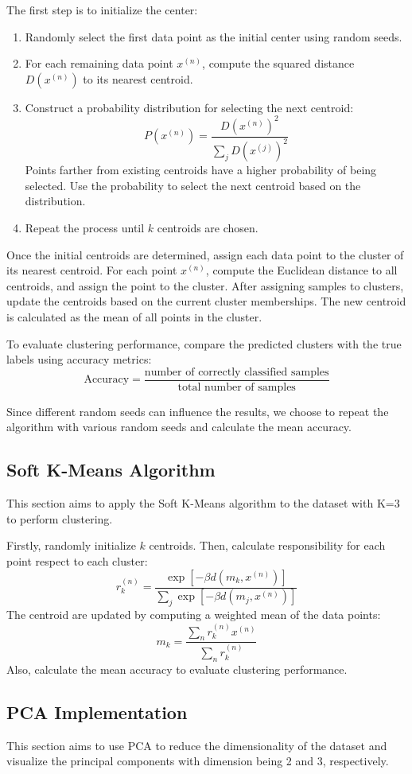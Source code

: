 \documentclass{article}
\begin{document}
The first step is to initialize the center:
\begin{enumerate}
    \item Randomly select the first data point as the initial center using random seeds.
    \item For each remaining data point $x^{(n)}$, compute the squared distance $D(x^{(n)})$ to its nearest centroid.
    \item Construct a probability distribution for selecting the next centroid:
    $$
    P(x^{(n)})=\frac{D(x^{(n)})^2}{\sum_{j}D(x^{(j)})^2}
    $$
    Points farther from existing centroids have a higher probability of being selected. Use the probability to select the next centroid based on the distribution.
    \item Repeat the process until $k$ centroids are chosen.
\end{enumerate} 
Once the initial centroids are determined, assign each data point to the cluster of its nearest centroid. For each point $x^{(n)}$, compute the Euclidean distance to all centroids, and assign the point to the cluster. After assigning samples to clusters, update the centroids based on the current cluster memberships. The new centroid is calculated as the mean of all points in the cluster.

To evaluate clustering performance, compare the predicted clusters with the true labels using accuracy metrics:
$$
\text{Accuracy}=\frac{\text{number of correctly classified samples}}{\text{total number of samples}}
$$

Since different random seeds can influence the results, we choose to repeat the algorithm with various random seeds and calculate the mean accuracy.

\subsection{Soft K-Means Algorithm}
This section aims to apply the Soft K-Means algorithm to the dataset with K=3 to perform clustering.

Firstly, randomly initialize $k$ centroids. Then, calculate responsibility for each point respect to each cluster:
$$
r_k^{(n)}=\frac{\exp [-\beta d(m_k,x^{(n)})]}{\sum_{j}\exp [-\beta d(m_j,x^{(n)})]}
$$
The centroid are updated by computing a weighted mean of the data points:
$$
m_k=\frac{\sum_n r_k^{(n)}x^{(n)}}{\sum_n r_k^{(n)}}
$$
Also, calculate the mean accuracy to evaluate clustering performance.

\subsection{PCA Implementation}
This section aims to use PCA to reduce the dimensionality of the dataset and visualize the principal components with dimension being 2 and 3, respectively.
\end{document}
